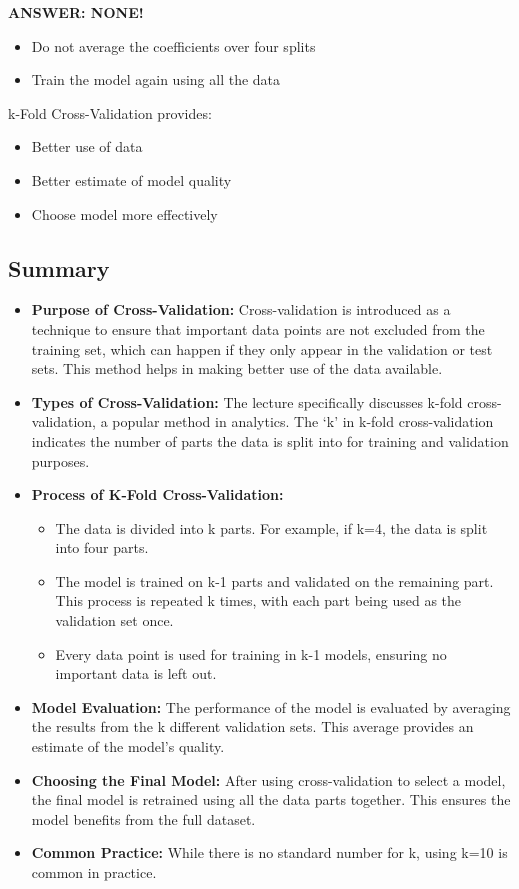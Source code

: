 \documentclass[
]{book}
\providecommand{\tightlist}{%
  \setlength{\itemsep}{0pt}\setlength{\parskip}{0pt}}
\begin{document}
\textbf{ANSWER: NONE!}

\begin{itemize}
\tightlist
\item
  Do not average the coefficients over four splits
\item
  Train the model again using all the data
\end{itemize}

k-Fold Cross-Validation provides:

\begin{itemize}
\tightlist
\item
  Better use of data
\item
  Better estimate of model quality
\item
  Choose model more effectively
\end{itemize}

\subsection{Summary}\label{summary-2}

\begin{itemize}
\tightlist
\item
  \textbf{Purpose of Cross-Validation:} Cross-validation is introduced as a technique to ensure that important data points are not excluded from the training set, which can happen if they only appear in the validation or test sets. This method helps in making better use of the data available.
\item
  \textbf{Types of Cross-Validation:} The lecture specifically discusses k-fold cross-validation, a popular method in analytics. The `k' in k-fold cross-validation indicates the number of parts the data is split into for training and validation purposes.
\item
  \textbf{Process of K-Fold Cross-Validation:}

  \begin{itemize}
  \tightlist
  \item
    The data is divided into k parts. For example, if k=4, the data is split into four parts.
  \item
    The model is trained on k-1 parts and validated on the remaining part. This process is repeated k times, with each part being used as the validation set once.
  \item
    Every data point is used for training in k-1 models, ensuring no important data is left out.
  \end{itemize}
\item
  \textbf{Model Evaluation:} The performance of the model is evaluated by averaging the results from the k different validation sets. This average provides an estimate of the model's quality.
\item
  \textbf{Choosing the Final Model:} After using cross-validation to select a model, the final model is retrained using all the data parts together. This ensures the model benefits from the full dataset.
\item
  \textbf{Common Practice:} While there is no standard number for k, using k=10 is common in practice.
\end{itemize}
\end{document}
